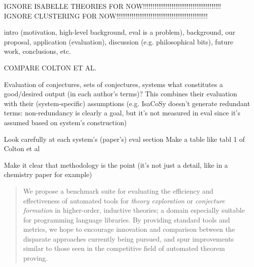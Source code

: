 
\date{Received: date / Accepted: date}


\maketitle
IGNORE ISABELLE THEORIES FOR NOW!!!!!!!!!!!!!!!!!!!!!!!!!!!!!!!!!!!!!!!!!
IGNORE CLUSTERING FOR NOW!!!!!!!!!!!!!!!!!!!!!!!!!!!!!!!!!!!!!!!!!!!!!!!!

intro (motivation, high-level background, eval is a problem),
background,
our proposal,
application (evaluation),
discussion (e.g. philosophical bits),
future work, conclusions, etc.

COMPARE COLTON ET AL.

Evaluation of conjectures, sets of conjectures, systems
what constitutes a good/desired output (in each author's terms)? This combines
their evaluation with their (system-specific) assumptions (e.g. IsaCoSy doesn't
generate redundant terms: non-redundancy is clearly a goal, but it's not measured
in eval since it's assumed based on system's construction)

Look carefully at each system's (paper's) eval section
Make a table like tabl 1 of Colton et al

Make it clear that methodology is the point (it's not just a detail, like in a
chemistry paper for example)

\begin{abstract}
  We propose a benchmark suite for evaluating the efficiency and effectiveness
  of automated tools for \emph{theory exploration} or
  \emph{conjecture formation} in higher-order, inductive theories; a domain
  especially suitable for programming language libraries. By providing standard
  tools and metrics, we hope to encourage innovation and comparison between the
  disparate approaches currently being pursued, and spur improvements similar to
  those seen in the competitive field of automated theorem proving.
\end{abstract}


